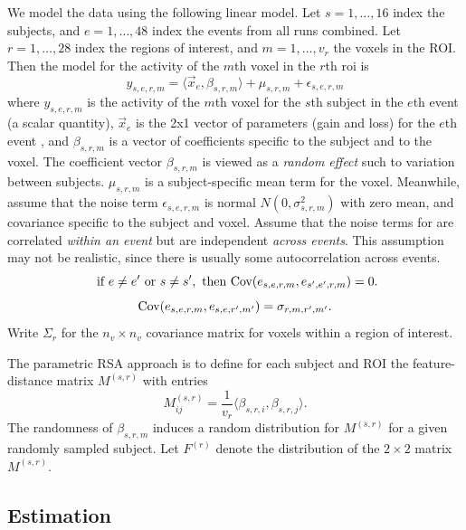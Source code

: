 \documentclass[12pt]{article}
\begin{document}
We model the data using the following linear model.
Let $s = 1,\hdots, 16$ index the subjects, and $e = 1,\hdots, 48$ index the events from all runs combined.
Let $r = 1,\hdots, 28$ index the regions of interest, and $m = 1,\hdots, v_r$ the voxels in the ROI.
Then the model for the activity of the $m$th voxel in the $r$th roi is
\[
y_{s, e, r, m} = \langle \vec{x}_{e}, \beta_{s, r, m} \rangle + \mu_{s, r, m} + \epsilon_{s, e, r, m}
\] 
where $y_{s, e, r, m}$ is the activity of the $m$th voxel for the $s$th subject in the $e$th event (a scalar quantity),
$\vec{x}_e$ is the 2x1 vector of parameters (gain and loss) for the $e$th event ,
and $\beta_{s, r, m}$ is a vector of coefficients specific to the subject and to the voxel.
The coefficient vector $\beta_{s, r, m}$ is viewed as a \emph{random effect} such to variation between subjects.
$\mu_{s, r, m}$ is a subject-specific mean term for the voxel.
Meanwhile, assume that the noise term $\epsilon_{s, e, r, m}$ is normal $N(0, \sigma^2_{s, r, m})$
with zero mean, and covariance specific to the subject and voxel.
Assume that the noise terms for are correlated \emph{within an event} but are independent \emph{across events}.  This assumption may not be realistic, since there is usually some autocorrelation across events.
\[
\text{ if }e \neq e' \text{ or }s \neq s', \text{ then }\text{Cov}(e_{s, e, r, m}, e_{s', e', r, m}) = 0 .
\]
\[
\text{Cov}(e_{s, e, r, m}, e_{s, e, r', m'}) = \sigma_{r,m,r',m'}.
\]
Write $\Sigma_{r}$ for the $n_v \times n_v$ covariance matrix for voxels within a region of interest.

The parametric RSA approach is to define for each subject and ROI the feature-distance matrix $M^{(s, r)}$ with entries
\[
M^{(s, r)}_{ij} = \frac{1}{v_r}\langle \beta_{s, r, i}, \beta_{s, r, j }\rangle.
\]
The randomness of $\beta_{s, r, m}$ induces a random distribution for $M^{(s, r)}$ for a given randomly sampled subject. Let $F^{(r)}$ denote the distribution of the $2 \times 2$ matrix $M^{(s, r)}$.

\subsection{Estimation}
\end{document}
